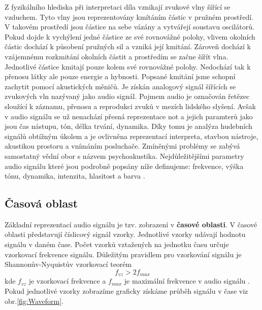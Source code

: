   Z fyzikálního hlediska při interpretaci díla vznikají zvukové vlny šířící se vzduchem.
  Tyto vlny jsou reprezentovány kmítáním částic v pružném prostředí. V takovém prostředí jsou částice na sebe vázány a vytvářejí soustavu oscilátorů. Pokud dojde k vychýlení jedné částice ze své rovnovážné polohy,
  vlivem okolních částic dochází k působení pružných sil a vzniká její kmitání. 
  Zároveň dochází k vzájemnému rozkmitání okolních částit a prostředím se začne šířít vlna. Jednotlivé částice kmitají pouze kolem své rovnovážné polohy. Nedochází tak k přenosu látky ale pouze energie a hybnosti\cite{crocker1998handbook}.
  Popsané kmitání jsme schopní zachytit pomocí akustických měničů.
  Je získán analogový signál šířících se zvukových vln nazývaný jako audio signál.
  Pojmem audio je označován řetězec sloužící k záznamu, přenosu a reprodukci zvuků v mezích lidského slyšení.
  Avšak v audio signálu se už nenachází přesná reprezentace not a jejich paramterů jako jsou čas nástupu, tón, délka trvání, dynamika.
  Díky tomu je analýza hudebních signálů obtížným úkolem a je ovlivněna reprezentací interpreta, stavbou nástroje, akustikou prostoru a vnímáním posluchače.
  Zmíněnými problémy se zabývá samostatný vědní obor s názvem psychoakustika.
  Nejdůležitějšími parametry audio signálu které jsou podrobně popsány níže definujeme: frekvence, výška tónu, dynamika, intenzita, hlasitost a barva \cite{fundamental_of_music_processing}.

  \subsection{Časová oblast}
  Základní reprezentací audio signálu je tzv. zobrazení v \textbf{časové oblasti}.
  V časové oblasti představují číslicový signál vzorky. Jednotlivé vzorky udávají hodnotu signálu v daném čase.
  Počet vzorků vztažených na jednotku času určuje vzorkovací frekvence signálu.
  Důležitým pravidlem pro vzorkování signálu je Shannonův-Nyquistův vzorkovací teorém
  \begin{equation}
    f_{vz} > 2f_{max}
    \label{rov:vzorkovaci_teorem}
  \end{equation}
  kde $f_{vz}$ je vzorkovací frekvence a $f_{max}$ je maximální frekvence v audio signálu \cite{bracewell1978fourier}.  
  Pokud jednotlivé vzorky zobrazíme graficky získáme průběh signálu v čase viz obr.\ref{fig:Waveform}.

